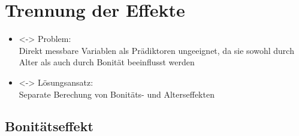 \section{Trennung der Effekte}
\begin{frame}[c]

  \begin{itemize}
  \item<\theFirstElement-> Problem: \\
    Direkt messbare Variablen als Prädiktoren ungeeignet, da sie sowohl durch Alter als auch durch Bonität beeinflusst werden
  \item<\theFirstElement-> Lösungsansatz: \\
    Separate Berechung von Bonitäts- und Alterseffekten
  \end{itemize}


\end{frame}

\subsection{Bonitätseffekt}

